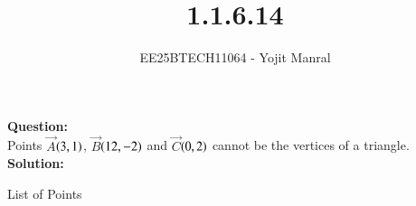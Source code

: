 \documentclass[journal]{IEEEtran}
\begin{document}

\vspace{3cm}

\title{1.1.6.14}
\author{EE25BTECH11064 - Yojit Manral}

\maketitle
{\let\newpage\relax\maketitle}
\renewcommand{\thefigure}{\theenumi}
\renewcommand{\thetable}{\theenumi}
\setlength{\intextsep}{10pt} %

\textbf{Question:}\\
Points $\Vec{A}$$\left(3,1\right)$, $\Vec{B}$$\left(12,-2\right)$ and $\Vec{C}$$\left(0,2\right)$ cannot be the vertices of a triangle.\\

\textbf{Solution:}\\
\begin{table}[h!]    
  \centering
  
  \caption{List of Points}
  \label{Table_1}
\end{table}\\
\end{document}
